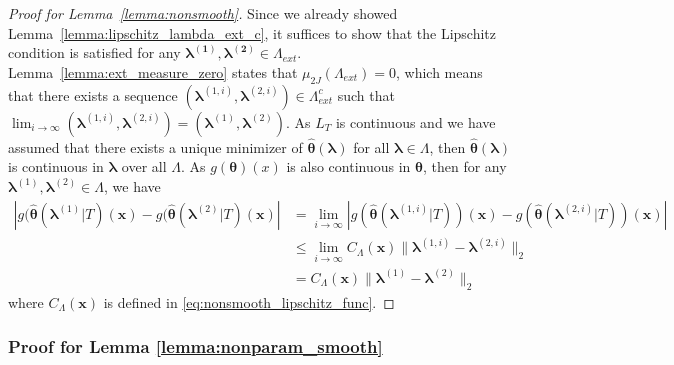 \documentclass[10pt]{book}
\theoremstyle{definition}
\begin{document}
\begin{proof}[Proof for Lemma~\ref{lemma:nonsmooth}]
	Since we already showed Lemma~\ref{lemma:lipschitz_lambda_ext_c}, it suffices to show that the Lipschitz condition is satisfied for any $\boldsymbol{\lambda^{(1)}},\boldsymbol{\lambda^{(2)}}\in\Lambda_{ext}$.
	Lemma~\ref{lemma:ext_measure_zero} states that $\mu_{2J}(\Lambda_{ext}) = 0$, which means that there exists a sequence
	$\left(\boldsymbol{\lambda}^{(1,i)},\boldsymbol{\lambda}^{(2,i)}\right)\in\Lambda_{ext}^{c}$
	such that $\lim_{i\rightarrow\infty}\left(\boldsymbol{\lambda}^{(1,i)},\boldsymbol{\lambda}^{(2,i)}\right)=\left(\boldsymbol{\lambda}^{(1)},\boldsymbol{\lambda}^{(2)}\right)$.
	As $L_T$ is continuous and we have assumed that there exists a unique minimizer of $\hat{\boldsymbol{\theta}}(\boldsymbol{\lambda})$ for all $\boldsymbol{\lambda} \in \Lambda$, then $\hat{\boldsymbol{\theta}}(\boldsymbol{\lambda})$ is continuous in $\boldsymbol{\lambda}$ over all $\Lambda$.
	As $g(\boldsymbol{\theta})(x)$ is also continuous in $\boldsymbol{\theta}$, then for any $\boldsymbol{\lambda}^{(1)},\boldsymbol{\lambda}^{(2)}\in\Lambda$,
	we have
	\begin{align}
		\left |
		g(\hat{\boldsymbol{\theta}}(\boldsymbol{\lambda}^{(1)} | T)(\boldsymbol{x})
		-
		g(\hat{\boldsymbol{\theta}}(\boldsymbol{\lambda}^{(2)} | T)(\boldsymbol{x})
		\right |
		& = \lim_{i\rightarrow\infty}
		\left |
		g(\hat{\boldsymbol{\theta}}(\boldsymbol{\lambda}^{(1,i)} |T))(\boldsymbol{x})
		-
		g(\hat{\boldsymbol{\theta}}(\boldsymbol{\lambda}^{(2,i)} |T))(\boldsymbol{x})
		\right |\\
		& \le \lim_{i\rightarrow\infty}
		C_\Lambda(\boldsymbol{x})
		\|\boldsymbol{\lambda}^{(1,i)}-\boldsymbol{\lambda}^{(2,i)}\|_{2}\\
		& = C_\Lambda(\boldsymbol{x})
		\|\boldsymbol{\lambda}^{(1)}-\boldsymbol{\lambda}^{(2)}\|_{2}
	\end{align}
	where $C_\Lambda(\boldsymbol{x})$ is defined in \eqref{eq:nonsmooth_lipschitz_func}.
\end{proof}

\subsubsection{Proof for Lemma \ref{lemma:nonparam_smooth}}
\end{document}
